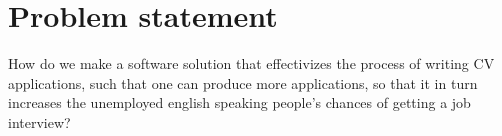 \section{Problem statement}\label{sec:problem}
How do we make a software solution that effectivizes the process of writing CV applications, such that one can produce more applications, 
so that it in turn increases the unemployed english speaking people's chances of getting a job interview?